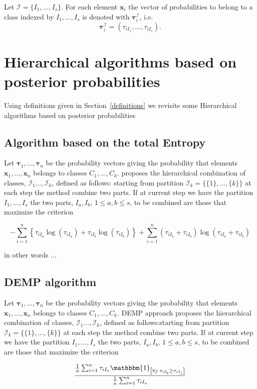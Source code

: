 \documentclass[10pt, a4paper]{article}
\begin{document}
Let $\mathcal{I} = \{ I_1, \dots, I_s\}$. For each element $\textbf{x}_i$ the vector of probabilities to belong to a class indexed by $I_1, \dots, I_s$ is denoted with ${\boldsymbol\tau}^{\mathcal{I}}_i$, i.e. \[ {\boldsymbol\tau}^{\mathcal{I}}_i = ( \tau_{i I_1}, \dots, \tau_{i I_s}). \] 

\section{Hierarchical algorithms based on posterior probabilities}

Using definitions given in Section~\ref{definitions} we revisite some Hierarchical algorithms based on posterior probabilities

\subsection*{Algorithm based on the total Entropy}

Let ${\boldsymbol\tau}_1, \dots, {\boldsymbol\tau}_n$ be the probability vectors giving the probability that elements $\textbf{x}_1, \dots, \textbf{x}_n$ belongs to classes $C_1, \dots, C_k$.  \cite{baudry2010combining} proposes the  hierarchical combination of classes,  $\mathcal{I}_1 \dots, \mathcal{I}_k$, defined as follows: starting from partition $\mathcal{I}_k = \{\{1\},\dots, \{k\}\}$ at each step the method combine two parts. If at current step we have the partition  $I_1, \dots, I_s$ the two parts, $I_a, I_b$, $1 \leq a,b \leq s$, to be combined are those that maximize the criterion

\[
- \sum_{i=1}^n \left\{ \tau_{iI_a} \log(\tau_{iI_a}) + \tau_{iI_b} \log(\tau_{iI_b})\right\} +  \sum_{i=1}^n  (\tau_{iI_a}+\tau_{iI_b}) \log(\tau_{iI_a} + \tau_{iI_b})
\]

in other words $\dots$

\subsection*{DEMP algorithm}

Let ${\boldsymbol\tau}_1, \dots, {\boldsymbol\tau}_n$ be the probability vectors giving the probability that elements $\textbf{x}_1, \dots, \textbf{x}_n$ belongs to classes $C_1, \dots, C_k$. DEMP approach \citep{hennig2010methods} proposes the hierarchical combination of classes,  $\mathcal{I}_1 \dots, \mathcal{I}_k$, defined as follows:starting from partition $\mathcal{I}_k = \{\{1\},\dots, \{k\}\}$ at each step the method combine two parts. If at current step we have the partition  $I_1, \dots, I_s$ the two parts, $I_a, I_b$, $1 \leq a,b \leq s$,  to be combined are those that maximize the criterion

\[
\frac{ \frac{1}{n} \sum_{i=1}^n {\tau_{iI_a} \mathbbm{1}_{\left[ \forall j\; \tau_{i I_{b}} \geq \tau_{iI_j} \right]}}}{ \frac{1}{n} \sum_{i=1}^n \tau_{iI_a}}
\]



{}
\end{document}
